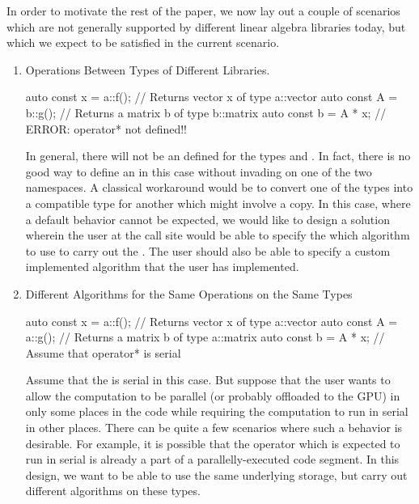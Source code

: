 \documentclass[oneside,11pt,a4paper]{jbarticle}
\begin{document}
In order to motivate the rest of the paper, we now lay out a couple of scenarios
which are not generally supported by different linear algebra libraries today,
but which we expect to be satisfied in the current scenario.
\begin{enumerate}
  \item Operations Between Types of Different Libraries.

\begin{acodecpp}{}
auto const x = a::f();  // Returns vector x of type a::vector
auto const A = b::g();  // Returns a matrix b of type b::matrix
auto const b = A * x;   // ERROR: operator* not defined!!
\end{acodecpp}
In general, there will not be an  defined for the types
 and . In fact, there is no good way
to define an  in this case without invading on one of the
two namespaces. A classical workaround would be to convert one of the types into
a compatible type for another which might involve a copy. In this case, where a
default behavior cannot be expected, we would like to design a solution wherein
the user at the call site would be able to specify the which algorithm to use to
carry out the . The user should also be able to specify a
custom implemented algorithm that the user has implemented.

\item Different Algorithms for the Same Operations on the Same Types

\begin{acodecpp}{}
auto const x = a::f();  // Returns vector x of type a::vector
auto const A = a::g();  // Returns a matrix b of type a::matrix
auto const b = A * x;   // Assume that operator* is serial
\end{acodecpp}
Assume that the  is serial in this case. But suppose that
the user wants to allow the computation to be parallel (or probably offloaded to
the GPU) in only some places in the code while requiring the computation to run
in serial in other places. There can be quite a few scenarios where such a
behavior is desirable. For example, it is possible that the operator which is
expected to run in serial is already a part of a parallelly-executed code
segment. In this design, we want to be able to use the same underlying storage,
but carry out different algorithms on these types.
\end{enumerate}
\end{document}

